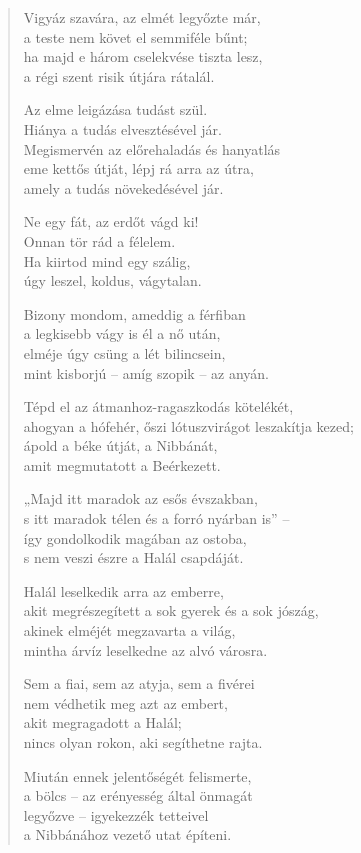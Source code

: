 \begin{verse}
 Vigyáz szavára, az elmét legyőzte már,\\
a teste nem követ el semmiféle bűnt;\\
ha majd e három cselekvése tiszta lesz,\\
a régi szent risik útjára rátalál.

 Az elme leigázása tudást szül.\\
Hiánya a tudás elvesztésével jár.\\
Megismervén az előrehaladás és hanyatlás\\
eme kettős útját, lépj rá arra az útra,\\
amely a tudás növekedésével jár.

 Ne egy fát, az erdőt vágd ki!\\
Onnan tör rád a félelem.\\
Ha kiirtod mind egy szálig,\\
úgy leszel, koldus, vágytalan.

 Bizony mondom, ameddig a férfiban\\
a legkisebb vágy is él a nő után,\\
elméje úgy csüng a lét bilincsein,\\
mint kisborjú – amíg szopik – az anyán.

 Tépd el az átmanhoz-ragaszkodás kötelékét,\\
ahogyan a hófehér, őszi lótuszvirágot leszakítja kezed;\\
ápold a béke útját, a Nibbánát,\\
amit megmutatott a Beérkezett.

 „Majd itt maradok az esős évszakban,\\
s itt maradok télen és a forró nyárban is” –\\
így gondolkodik magában az ostoba,\\
s nem veszi észre a Halál csapdáját.

 Halál leselkedik arra az emberre,\\
akit megrészegített a sok gyerek és a sok jószág,\\
akinek elméjét megzavarta a világ,\\
mintha árvíz leselkedne az alvó városra.

 Sem a fiai, sem az atyja, sem a fivérei\\
nem védhetik meg azt az embert,\\
akit megragadott a Halál;\\
nincs olyan rokon, aki segíthetne rajta.

 Miután ennek jelentőségét felismerte,\\
a bölcs  – az erényesség által önmagát\\
legyőzve – igyekezzék tetteivel\\
a Nibbánához vezető utat építeni.

\end{verse}
